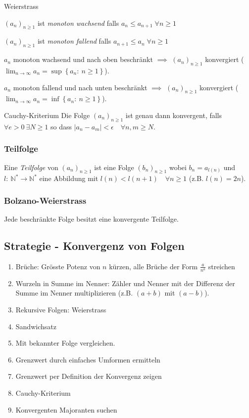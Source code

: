\documentclass[a4paper,10pt]{article}
\def\limn{\lim_{n\to \infty}}
\def\N{\mathbb{N}}
\begin{document}
\begin{mainbox}{Weierstrass}
\begin{subbox}{}
$(a_n)_{n \geq 1}$ ist \emph{monoton wachsend} falls $a_n \leq a_{n+1} \; \forall n \geq 1$

$(a_n)_{n \geq 1}$ ist \emph{monoton fallend} falls $a_{n+1} \leq a_n \; \forall n \geq 1$
\end{subbox}
$a_n$ monoton wachsend und nach oben beschränkt $\implies$ $(a_n)_{n \geq 1}$ konvergiert ($\limn a_n = \sup \left\{ a_n : \ n \ge 1 \right\}$).

$a_n$ monoton fallend und nach unten beschränkt $\implies$ $(a_n)_{n \geq 1}$ konvergiert ($\limn a_n = \inf \left\{ a_n : \ n \ge 1 \right\}$).
\end{mainbox}

\begin{mainbox}{Cauchy-Kriterium}
Die Folge $(a_n)_{n \geq 1}$ ist genau dann konvergent, falls $\forall e > 0 \ \exists N \ge 1$ so dass $| a_n - a_m | < \epsilon \quad \forall n,m \ge N$.
\end{mainbox}

\subsubsection{Teilfolge}
Eine \emph{Teilfolge} von $(a_n)_{n \geq 1}$ ist eine Folge $(b_n)_{n \geq 1}$ wobei $b_n = a_{l(n)}$ und $l: \: \N^* \to \N^*$ eine Abbildung mit $l(n) < l(n+1) \quad \forall n \ge 1$ (z.B. $l(n) = 2n$). 

\subsubsection{Bolzano-Weierstrass}
\begin{mainbox}{}
Jede beschränkte Folge besitzt eine konvergente Teilfolge.
\end{mainbox}

\subsection{Strategie - Konvergenz von Folgen}
\begin{enumerate}
 \item Brüche: Grösste Potenz von $n$ kürzen, alle Brüche der Form $\frac{a}{n^a}$ streichen
 \item Wurzeln in Summe im Nenner: Zähler und Nenner mit der Differenz der Summe im Nenner multiplizieren (z.B. $(a+b)$ mit $(a-b)$).
 \item Rekursive Folgen: Weierstrass
 \item Sandwichsatz
 \item Mit bekannter Folge vergleichen.
 \item Grenzwert durch einfaches Umformen ermitteln
 \item Grenzwert per Definition der Konvergenz zeigen
 \item Cauchy-Kriterium
 \item Konvergenten Majoranten suchen
\end{enumerate}
\end{document}

